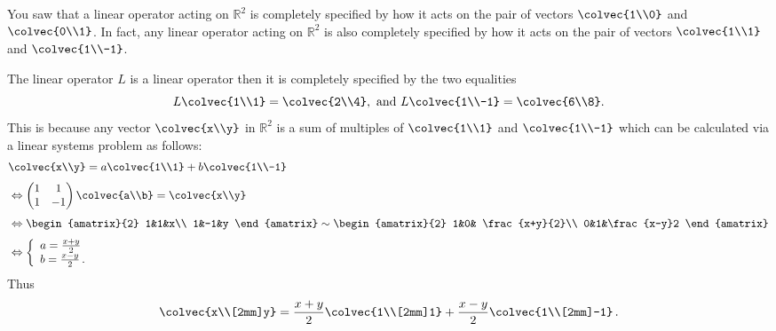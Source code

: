 You saw that a linear operator acting on $\mathbb{R}^2$ is completely specified by how it acts on the pair of vectors $\colvec{1\\0}$ and $\colvec{0\\1}$. 
In fact, any linear operator acting on $\mathbb{R}^2$ is also completely specified by how it acts on the pair of vectors $\colvec{1\\1}$ and $\colvec{1\\-1}$.

\begin{example} The linear operator $L$ is a linear operator then it is completely specified \hypertarget{nonstandard r2 basis}{by the two equalities} 
\[
L\colvec{1\\1}= \colvec{2\\4}, \text{~and~} L\colvec{1\\-1}=\colvec{6\\8}.
\] 
This is because any vector $\colvec{x\\y}$ in $\mathbb{R}^2$ is a sum of multiples of
$\colvec{1\\1}$ and $\colvec{1\\-1}$ which can be calculated via a linear systems problem as follows:
\begin{align*}&
\colvec{x\\y}=a\colvec{1\\1}+b\colvec{1\\-1}\\[1mm]
&\Leftrightarrow
\begin{pmatrix}
1&1\\
1&-1
\end{pmatrix}
\colvec{a\\b}
=\colvec{x\\y}\\[1mm]
&\Leftrightarrow 
\begin{amatrix}{2}
1&1&x\\
1&-1&y
\end{amatrix}
\sim \begin{amatrix}{2}
1&0& \frac{x+y}{2}\\
0&1&\frac{x-y}2
\end{amatrix}\\[1mm]
&\Leftrightarrow
\left\{ 
\begin{array}{l}
a=\frac{x+y}{2}\\
b=\frac{x-y}{2}\, .
\end{array}
\right.
\end{align*}
Thus
\[
\colvec{x\\[2mm]y}=\frac{x+y}{2}\colvec{1\\[2mm]1}+\frac{x-y}{2}\colvec{1\\[2mm]-1}\, .
\]
\end{example}
